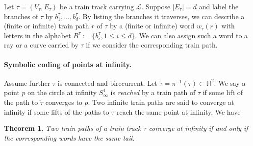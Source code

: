 \documentclass[11pt]{article} %
\theoremstyle{plain}
\newtheorem{thm}{Theorem}[section]
\theoremstyle{definition}
\numberwithin{equation}{section}
\begin{document}
Let $\tau=(V_\tau,E_\tau)$ be a train track carrying $\mathcal{L}$. Suppose $|E_\tau|=d$ and label the branches of $\tau$ by $b_1^{\tau}, \dots, b_d^{\tau}$. By listing the branches it traverses, we can describe a (finite or infinite) train path $r$ of $\tau$ by a (finite or infinite) word $w_{\tau}(r)$ with letters in the alphabet $B^\tau:=\{ b_i^{\tau} , 1 \leq i \leq d\}$. We can also assign such a word to a ray or a curve carried by $\tau$ if we consider the corresponding train path. 




\paragraph{Symbolic coding of points at infinity.}
Assume further $\tau$ is connected and birecurrent. Let $\tilde\tau=\pi^{-1}(\tau)\subset\mathbb{H}^2$. We say a point $p$ on the circle at infinity $S^1_\infty$ is \emph{reached} by a train path of $\tau$ if some lift of the path to $\tilde\tau$ converges to $p$. Two infinite train paths are said to converge at infinity if some lifts of the paths to $\tilde\tau$ reach the same point at infinity. We have
\begin{thm}\label{thm:tail2}
Two train paths of a train track $\tau$ converge at infinity if and only if the corresponding words have the same tail. 
\end{thm}
\end{document}
